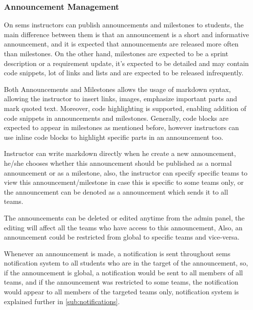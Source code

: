 \subsubsection{Announcement Management}
\label{subs:announcement-management}
On \ac{sems} instructors can publish announcements and milestones to students, the main difference between them
is that an announcement is a short and informative announcement, and it is expected that announcements are released
more often than milestones. On the other hand, milestones are expected to be a sprint description or a requirement update,
it's expected to be detailed and may contain code snippets, lot of links and lists and are expected to be released infrequently.

\newParagraph
Both Announcements and Milestones allows the usage of markdown syntax, allowing the instructor to insert links, images, emphasize important
parts and mark quoted text. Moreover, code highlighting is supported, enabling addition of code snippets in announcements and milestones. Generally,
code blocks are expected to appear in milestones as mentioned before, however instructors can use inline code blocks to highlight specific parts
in an announcement too.

\newParagraph
Instructor can write markdown directly when he create a new announcement, he/she chooses whether this announcement should be published
as a normal announcement or as a milestone, also, the instructor can specify specific teams to view this announcement/milestone in case
this is specific to some teams only, or the announcement can be denoted as a  announcement which sends it to all
teams.

\newParagraph
The announcements can be deleted or edited anytime from the admin panel, the editing will affect all the teams who have access to this announcement,
Also, an announcement could be restricted from global to specific teams and vice-versa.

\newParagraph
Whenever an announcement is made, a notification is sent throughout \ac{sems} notification system to all students who are in the target
of the announcement, so, if the announcement is global, a notification would be sent to all members of all teams, and if the announcement
was restricted to some teams, the notification would appear to all members of the targeted teams only, notification system is explained further in
\ref{sub:notifications}.

